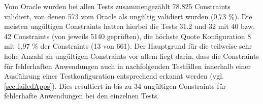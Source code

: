 Vom Oracle wurden bei allen Tests zusammengezählt 78.825 Constraints validiert, von denen 573 vom Oracle als ungültig validiert wurden (0,73 \%).
Die meisten ungültigen Constraints hatten hierbei die Tests 31.2 und 32 mit 40 bzw. 42 Constraints (von jeweils 5140 geprüften), die höchste Quote Konfiguration 8 mit 1,97 \% der Constraints (13 von 661).
Der Hauptgrund für die teilweise sehr hohe Anzahl an ungültigen Constraints vor allem liegt darin, dass die Constraints für fehlerhaften Anwendungen auch in nachfolgenden Testfällen innerhalb einer Ausführung einer Testkonfiguration entsprechend erkannt werden (vgl. \autoref{sec:failedApps}).
Dies resultiert in bis zu 34 ungültigen Constraints für fehlerhafte Anwendungen bei den einzelnen Tests.

